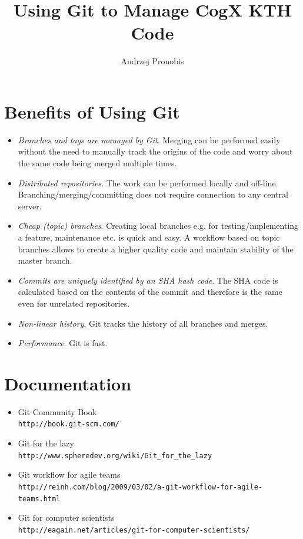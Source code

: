 \documentclass[a4paper,10pt]{article}
\title{Using Git to Manage CogX KTH Code}
\author{Andrzej Pronobis}
\begin{document}
\maketitle


\section{Benefits of Using Git}

\begin{itemize}
\item \textit{Branches and tags are managed by Git}. Merging can be performed easily without the need to manually track the origins of the code and worry about the same code being merged multiple times.
\item \textit{Distributed repositories}. The work can be performed locally and off-line. Branching/merging/committing does not require connection to any central server.
\item \textit{Cheap (topic) branches}. Creating local branches e.g. for testing/implementing a feature, maintenance etc. is quick and easy. A workflow based on topic branches allows to create a higher quality code and maintain stability of the master branch.
\item \textit{Commits are uniquely identified by an SHA hash code}. The SHA code is calculated based on the contents of the commit and therefore is the same even for unrelated repositories.
\item \textit{Non-linear history}. Git tracks the history of all branches and merges.
\item \textit{Performance}. Git is fast.
\end{itemize}


\section{Documentation}
\begin{itemize}
  \item Git Community Book \\
       \texttt{http://book.git-scm.com/}
  \item Git for the lazy \\
       \texttt{http://www.spheredev.org/wiki/Git\_for\_the\_lazy}
  \item Git workflow for agile teams \\
       \texttt{http://reinh.com/blog/2009/03/02/a-git-workflow-for-agile-teams.html}
  \item Git for computer scientists \\
        \texttt{http://eagain.net/articles/git-for-computer-scientists/}
\end{itemize}
\end{document}
